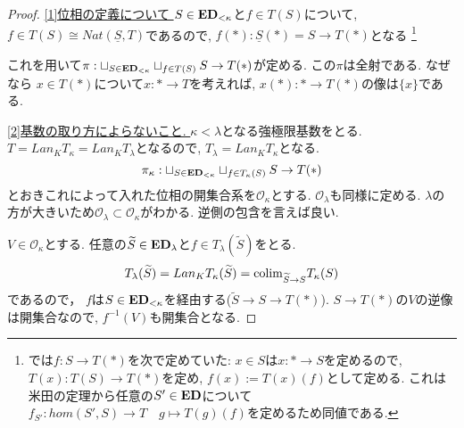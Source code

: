 \documentclass[dvipdfmx,a4paper,11pt]{report}
\newcommand{\colim}{{\rm colim}}
\theoremstyle{definition}
\newcommand{\xr}[1]{\textcolor{red}{#1}}
\begin{document}
\begin{proof}
\underline{[1]位相の定義について }
$S \in {\bf ED}_{<\kappa}$と$f \in T(S)$について, 
$f \in T(S) \cong Nat(\underline{S}, T)$であるので, 
$f(\ast) : \underline{S}(\ast)=S \to T(\ast)$となる
\footnote{\cite{Bar22}では$f : S \to T(\ast)$を次で定めていた: $x \in S$は$x : \ast \to S$を定めるので, $T(x) : T(S) \to T(\ast)$を定め, $f(x):=T(x)(f)$として定める. これは米田の定理から任意の$S' \in {\bf ED}$について$f_{S'} : hom(S', S) \to T \quad g \mapsto T(g)(f)$を定めるため同値である.}

これを用いて$\pi : \sqcup_{S \in {\bf ED}_{<\kappa}}  \sqcup_{f \in T(S) }  S \to T(\ast)$が定める. 
この$\pi$は全射である. なぜなら
$x \in T(\ast)$について$x : \ast \to T$を考えれば,
$x(\ast) : \ast \to T(\ast)$の像は$\{ x\}$である. 


\underline{[2]基数の取り方によらないこと. }
$\kappa < \lambda$となる強極限基数をとる.
$T = Lan_{K}T_{\kappa} = Lan_{K}T_{\lambda} $となるので,
$T_{\lambda} =Lan_{K}T_{\kappa} $となる.
$$
\pi_{\kappa} : \sqcup_{S \in {\bf ED}_{<\kappa}}  \sqcup_{f \in T_{\kappa}(S) }  S \to T(\ast)
$$
とおきこれによって入れた位相の開集合系を$\mathcal{O}_{\kappa}$とする.
$\mathcal{O}_{\lambda}$も同様に定める.
$\lambda$の方が大きいため$\mathcal{O}_{\lambda} \subset \mathcal{O}_{\kappa}$がわかる.
逆側の包含を言えば良い.

$V \in \mathcal{O}_{\kappa}$とする. 
任意の$\widetilde{S} \in {\bf ED}_{\lambda}$と$f \in T_{\lambda}(\widetilde{S})$をとる.
$$
 T_{\lambda}(\widetilde{S})=Lan_{K}T_{\kappa}(\widetilde{S})
 = \colim_{\widetilde{S} \to S} T_{\kappa}(S)
$$
であるので， $f$は$S \in { \bf ED}_{< \kappa}$を経由する($\widetilde{S} \to S \to T(\ast)$).
$S \to T(\ast)$の$V$の逆像は開集合なので, $f^{-1}(V)$も開集合となる.
\end{proof}
\end{document}
